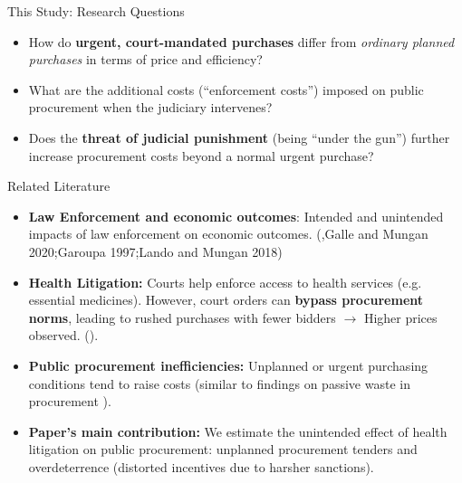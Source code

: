 \documentclass[aspectratio=169]{beamer}
\begin{document}
\begin{frame}{This Study: Research Questions}
  \begin{itemize}
    \item How do \textbf{urgent, court-mandated purchases} differ from \emph{ordinary planned purchases} in terms of price and efficiency?
    \item What are the additional costs (``enforcement costs'') imposed on public procurement when the judiciary intervenes?
    \item Does the \textbf{threat of judicial punishment} (being ``under the gun'') further increase procurement costs beyond a normal urgent purchase?
    
  \end{itemize}
\end{frame}

\begin{frame}{Related Literature}
  \begin{itemize}
    \item \textbf{Law Enforcement and economic outcomes}: Intended and unintended impacts of law enforcement on economic outcomes. (\cite{LaPorta2008},Galle and Mungan 2020;Garoupa 1997;Lando and Mungan 2018)
    \item \textbf{Health Litigation:} Courts help enforce access to health services (e.g. essential medicines). However, court orders can \textbf{bypass procurement norms}, leading to rushed purchases with fewer bidders $\rightarrow$ Higher prices observed. (\cite{wang2015right}).
    \item \textbf{Public procurement inefficiencies:} Unplanned or urgent purchasing conditions tend to raise costs (similar to findings on passive waste in procurement \cite{bandiera2009active,mironov2016corruption}).
    \item \textbf{Paper's main contribution:} We estimate the unintended effect of health litigation on public procurement: unplanned procurement tenders and overdeterrence (distorted incentives due to harsher sanctions).
  \end{itemize}
\end{frame}
\end{document}
